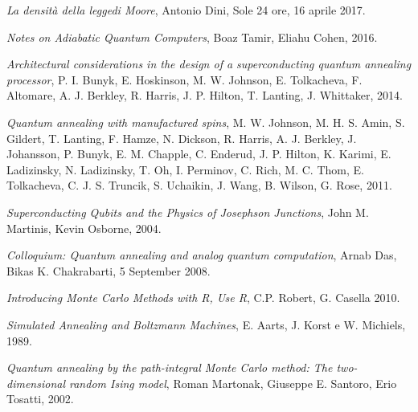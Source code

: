 \newpage
\begin{thebibliography}{99}

    \textit{La densità della leggedi Moore},
    Antonio Dini,
    Sole 24 ore,
    16 aprile 2017.

    \textit{Notes on Adiabatic Quantum Computers},
    Boaz Tamir, Eliahu Cohen,
    2016.

    \textit{Architectural considerations in the design of a superconducting quantum annealing processor},
    P. I. Bunyk, E. Hoskinson, M. W. Johnson, E. Tolkacheva, F. Altomare, A. J. Berkley, R. Harris, J. P. Hilton, T. Lanting, J. Whittaker,
    2014.

    \textit{Quantum annealing with manufactured spins},
    M. W. Johnson, M. H. S. Amin, S. Gildert, T. Lanting, F. Hamze, N. Dickson, R. Harris, A. J. Berkley, J. Johansson, P. Bunyk, E. M. Chapple, C. Enderud, J. P. Hilton, K. Karimi, E. Ladizinsky, N. Ladizinsky, T. Oh, I. Perminov, C. Rich, M. C. Thom, E. Tolkacheva, C. J. S. Truncik, S. Uchaikin, J. Wang, B. Wilson, G. Rose,
    2011.


    \textit{Superconducting Qubits and the Physics of Josephson Junctions},
    John M. Martinis, Kevin Osborne,
    2004.


    \textit{Colloquium: Quantum annealing and analog quantum computation},
    Arnab Das, Bikas K. Chakrabarti,
    5 September 2008.

    \textit{Introducing Monte Carlo Methods with R, Use R},
    C.P. Robert, G. Casella
    2010.

    \textit{Simulated Annealing and Boltzmann Machines},
    E. Aarts, J. Korst e W. Michiels,
    1989.

    \textit{Quantum annealing by the path-integral Monte Carlo method: The two-dimensional random Ising model},
    Roman Martonak, Giuseppe E. Santoro, Erio Tosatti,
    2002.

\end{thebibliography}
